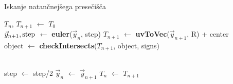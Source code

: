 \documentclass[titlepage]{article}
\begin{document}
\begin{algorithm}[H]
    \caption{Iskanje natančnejšega presečišča}
\begin{algorithmic}

    \State $T_{n}$, $T_{n+1}$ $\gets$ $T_{0}$
    \\
      \State {}
    \EndIf
    \State $\vec{y}_{n+1}, \hbox{step}$ $\gets$ \textbf{euler}($\vec{y}_{n}$, step)
    \State $T_{n+1}$ $\gets$ \textbf{uvToVec}($\vec{y}_{n+1}$, R) + center
    \\
    \State object $\gets$ \textbf{checkIntersects}($T_{n+1}$, object, signs)
    \\
    \\

        \State step $\gets$ step/2
    \Else
      \State $\vec{y}_{n}$ $\gets$ $\vec{y}_{n+1}$
      \State $T_{n}$ $\gets$ $T_{n+1}$
    \EndIf
  \EndWhile
\EndFunction
\end{algorithmic}
\end{algorithm}

\newpage
\end{document}
